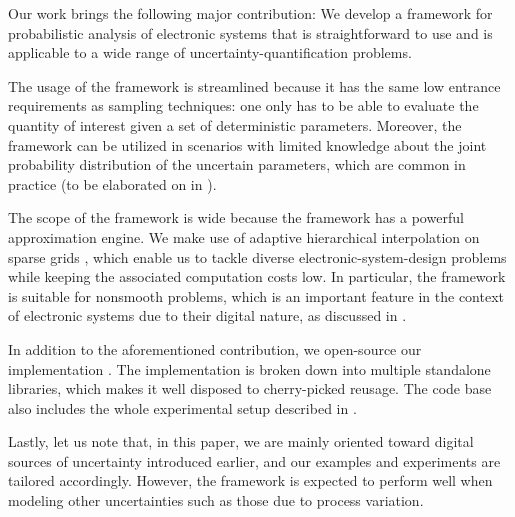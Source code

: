 Our work brings the following major contribution: We develop a framework for
probabilistic analysis of electronic systems that is straightforward to use and
is applicable to a wide range of uncertainty-quantification problems.

The usage of the framework is streamlined because it has the same low entrance
requirements as sampling techniques: one only has to be able to evaluate the
quantity of interest given a set of deterministic parameters. Moreover, the
framework can be utilized in scenarios with limited knowledge about the joint
probability distribution of the uncertain parameters, which are common in
practice (to be elaborated on in ).

The scope of the framework is wide because the framework has a powerful
approximation engine. We make use of adaptive hierarchical interpolation on
sparse grids \cite{jakeman2012, klimke2006, ma2009}, which enable us to tackle
diverse electronic-system-design problems while keeping the associated
computation costs low. In particular, the framework is suitable for nonsmooth
problems, which is an important feature in the context of electronic systems due
to their digital nature, as discussed in .

In addition to the aforementioned contribution, we open-source our
implementation \cite{sources}. The implementation is broken down into multiple
standalone libraries, which makes it well disposed to cherry-picked reusage. The
code base also includes the whole experimental setup described in
.

Lastly, let us note that, in this paper, we are mainly oriented toward digital
sources of uncertainty introduced earlier, and our examples and experiments are
tailored accordingly. However, the framework is expected to perform well when
modeling other uncertainties such as those due to process variation.
